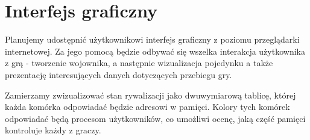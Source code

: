 \section{Interfejs graficzny}
Planujemy udostępnić użytkownikowi interfejs graficzny z poziomu przeglądarki internetowej. Za jego pomocą będzie odbywać się wszelka interakcja użytkownika z grą - tworzenie wojownika, a następnie wizualizacja pojedynku a także prezentację interesujących danych dotyczących przebiegu gry. 

Zamierzamy zwizualizować stan rywalizacji jako dwuwymiarową tablicę, której każda komórka odpowiadać będzie adresowi w pamięci. Kolory tych komórek odpowiadać będą procesom użytkowników, co umożliwi ocenę, jaką część pamięci kontroluje każdy z graczy.

